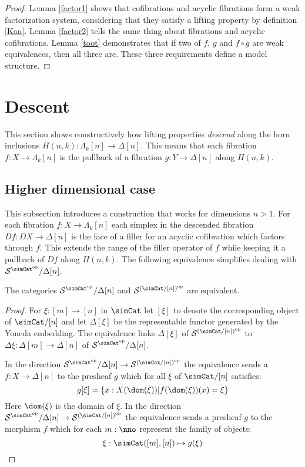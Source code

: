 \documentclass{tac}
\newcommand\cat\mathcal
\newcommand\set[1]{\left\{#1\right\}}
\newcommand\dual{^{\mathrm{op}}}
\newcommand\s{^{\simCat\dual}}
\newcommand\of{:}
\newcommand\simplex\Delta
\newcommand\horn\Lambda
\begin{document}
\begin{proof}
Lemma \ref{factor1} shows that cofibrations and acyclic fibrations form a weak factorization system, considering that they satisfy a lifting property by definition \ref{Kan}. Lemma \ref{factor2} tells the same thing about fibrations and acyclic cofibrations. Lemma \ref{toot} demonstrates that if two of $f$, $g$ and $f\circ g$ are weak equivalences, then all three are. These three requirements define a model structure.
\end{proof}

\section{Descent}
This section shows constructively how lifting properties \emph{descend} along the horn inclusions $H(n,k)\of \horn_k[n]\to\simplex[n]$. This means that each fibration $f\of X\to\horn_k[n]$ is the pullback of a fibration $g\of Y\to\simplex[n]$ along $H(n,k)$. %

\subsection{Higher dimensional case}
This subsection introduces a construction that works for dimensions $n>1$. For each fibration $f\of X\to \horn_k[n]$ each simplex in the descended fibration $Df\of DX\to \simplex[n]$ is the face of a filler for an acyclic cofibration which factors through $f$. This extends the range of the filler operator of $f$ while keeping it a pullback of $Df$ along $H(n,k)$. The following equivalence simplifies dealing with $\cat S\s/\simplex[n]$.

\begin{lemma} The categories $\cat S\s/\simplex[n]$ and $\cat S^{(\simCat/[n])\dual}$ are equivalent. \label{slice equivalence} \end{lemma}

\begin{proof} For $\xi\of[m]\to[n]$ in $\simCat$ let $[\xi]$ to denote the corresponding object of $\simCat/[n]$ and let $\simplex[\xi]$ be the representable functor generated by the Yoneda embedding. The equivalence links $\simplex[\xi]$ of $\cat S^{(\simCat/[n])\dual}$ to $\Delta\xi\of \simplex[m]\to \simplex[n]$ of $\cat S\s/\simplex[n]$.

In the direction $\cat S\s/\simplex[n]\to \cat S^{(\simCat/[n])\dual}$ the equivalence sends a $f\of X\to \simplex[n]$ to the presheaf $g$ which for all $\xi$ of $\simCat/[n]$ satisfies:
\[ g[\xi] = \set{ x\of X(\dom(\xi)) | f(\dom(\xi))(x)=\xi } \]
Here $\dom(\xi)$ is the domain of $\xi$.
In the direction $\cat S\s/\simplex[n]\to \cat S^{(\simCat/[n])\dual}$ the equivalence sends a presheaf $g$ to the morphism $f$ which for each $m\of\nno$ represent the family of objects:
\[ \xi\of\simCat([m],[n])\mapsto g(\xi) \]
\end{proof}
\end{document}
